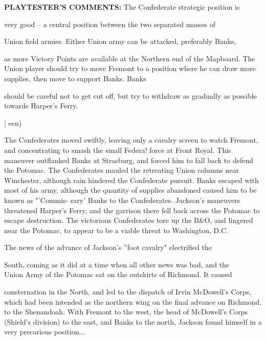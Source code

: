 \begin{scenariodata}
\textbf{PLAYTESTER'S COMMENTS:} The Confederate strategic position is\\
\end{scenariodata}

very good -- a central position between the two separated masses of

\begin{scenariodata}
Union field armies. Either Union army can be attacked, preferably Banks,\\
\end{scenariodata}

as more Victory Points are available at the Northern end of the Mapboard. The Union player should try to move Fremont to a position where he can draw more supplies, then move to support Banks. Banks

should be careful not to get cut off, but try to withdraw as gradually as possible towards Harper's Ferry.

| een)

The Confederates moved swiftly, leaving only a cavalry screen to watch Fremont, and concentrating to smash the small Federa! force at Front Royal. This maneuver outflanked Banks at Strasburg, and forced him to fall back to defend the Potomac. The Confederates mauled the retreating Union columns near Winchester, although rain hindered the Confederate pursuit. Banks escaped with most of his army, although the quantity of supplies abandoned caused him to be known as "'Commis- sary' Banks to the Confederates. Jackson's maneuvers threatened Harper's Ferry, and the garrison there fell back across the Potomac to escape destruction. The victorious Confederates tore up the B\&O, and lingered near the Potomac, to appear to be a viable threat to Washington, D.C.

The news of the advance of Jackson's ''foot cavalry" electrified the

\begin{scenariodata}
South, coming as it did at a time when all other news was bad, and the\\
Union Army of the Potomac sat on the outskirts of Richmond. It caused\\
\end{scenariodata}

consternation in the North, and led to the dispatch of Irvin McDowell's Corps, which had been intended as the northern wing on the final advance on Richmond, to the Shenandoah. With Fremont to the west, the head of McDowell's Corps (Shield's division) to the east, and Banks to the north, Jackson found himself in a very precarious position...


